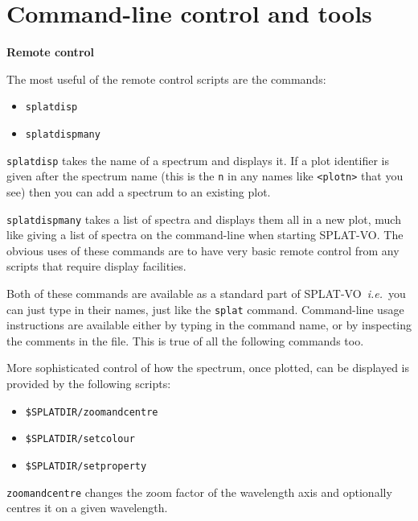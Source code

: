 \documentclass[twoside,11pt]{article}
\renewcommand{\_}{\texttt{\symbol{95}}}
\newcommand{\SPLAT}{\textsf{SPLAT-VO}}
\newcommand{\hitext}[1]{\texttt{#1}}
\newcommand{\ie}{\textit{i.e.}}
\newcommand{\subheading}[1]{\textbf{\large{#1}}}
\begin{document}

\section{Command-line control and tools}

\subheading{Remote control}

The most useful of the remote control scripts are the commands:
\begin{itemize}
 \item \hitext{splatdisp}
 \item \hitext{splatdispmany}
\end{itemize}
\hitext{splatdisp} takes the name of a spectrum and displays it.
If a plot identifier is given after the spectrum name (this is the
\hitext{n} in any names like \hitext{<plotn>} that you see) then you
can add a spectrum to an existing plot.

\hitext{splatdispmany} takes a list of spectra and displays them all in a
new plot, much like giving a list of spectra on the command-line when
starting \SPLAT. The obvious uses of these commands are to have very
basic remote control from any scripts that require display facilities.

Both of these commands are available as a standard part of \SPLAT\
\ie\ you can just type in their names, just like the \hitext{splat}
command. Command-line usage instructions
are available either by typing in the command name, or by inspecting
the comments in the file. This is true of all the following commands too.

More sophisticated control of how the spectrum, once plotted, can be
displayed is provided by the following scripts:
\begin{itemize}
 \item \hitext{\$SPLAT\_DIR/zoomandcentre}
 \item \hitext{\$SPLAT\_DIR/setcolour}
 \item \hitext{\$SPLAT\_DIR/setproperty}
\end{itemize}
\hitext{zoomandcentre} changes the zoom factor of the wavelength axis
and optionally centres it on a given wavelength.
\end{document}
